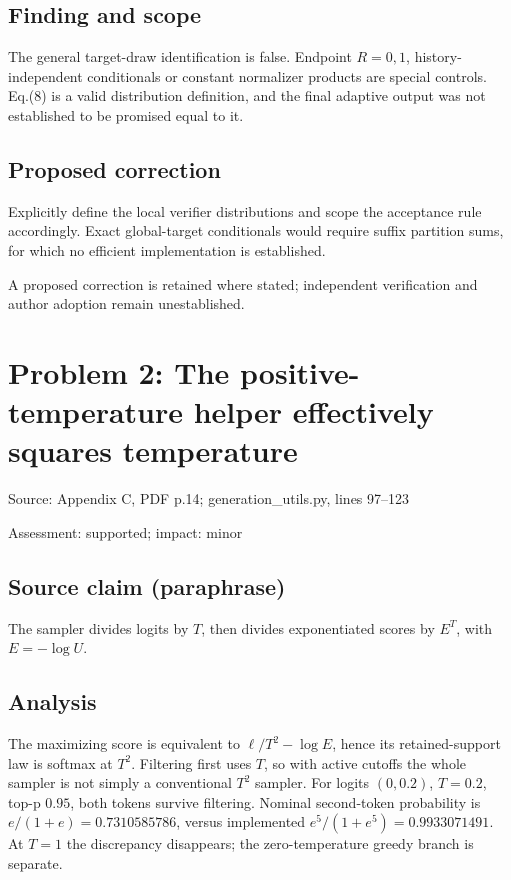 \documentclass[11pt]{article}
\begin{document}
\subsection*{Finding and scope}

The general target-draw identification is false. Endpoint \(R=0,1\), history-independent conditionals or constant normalizer products are special controls. Eq.(8) is a valid distribution definition, and the final adaptive output was not established to be promised equal to it.

\subsection*{Proposed correction}

Explicitly define the local verifier distributions and scope the acceptance rule accordingly. Exact global-target conditionals would require suffix partition sums, for which no efficient implementation is established.

A proposed correction is retained where stated; independent verification and author adoption remain unestablished.

\section*{Problem 2: The positive-temperature helper effectively squares temperature}

Source: Appendix C, PDF p.14; generation\_utils.py, lines 97–123

Assessment: supported; impact: minor

\subsection*{Source claim (paraphrase)}

The sampler divides logits by \(T\), then divides exponentiated scores by \(E^T\), with \(E=-\log U\).

\subsection*{Analysis}

The maximizing score is equivalent to \(\ell/T^2-\log E\), hence its retained-support law is softmax at \(T^2\). Filtering first uses \(T\), so with active cutoffs the whole sampler is not simply a conventional \(T^2\) sampler. For logits \((0,0.2)\), \(T=0.2\), top-p \(0.95\), both tokens survive filtering. Nominal second-token probability is \(e/(1+e)=0.7310585786\), versus implemented \(e^5/(1+e^5)=0.9933071491\). At \(T=1\) the discrepancy disappears; the zero-temperature greedy branch is separate.
\end{document}
